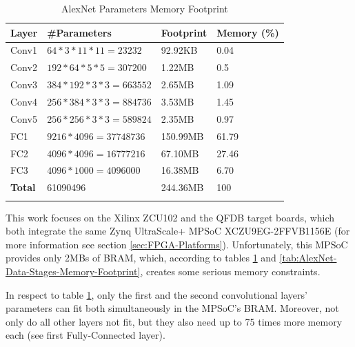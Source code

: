 \begin{table}[H]
	\caption{AlexNet Parameters Memory Footprint}
	\label{tab:AlexNet-Parameters-Memory-Footprint}
	\centering
	\begin{tabular}{llll}
		\toprule
		\textbf{Layer} & \textbf{\#Parameters} & \textbf{Footprint} & \textbf{Memory (\%)}  \\
		\midrule
			Conv1 & $64 * 3 * 11 * 11 = 23232$ & 92.92KB & 0.04 \\
			Conv2 & $192 * 64 * 5 * 5 = 307200$ & 1.22MB & 0.5 \\
			Conv3 & $384 * 192 * 3 * 3 = 663552$ & 2.65MB & 1.09 \\
			Conv4 & $256 * 384 * 3 * 3 = 884736$ & 3.53MB & 1.45 \\
			Conv5 & $256 * 256 * 3 * 3 = 589824$ & 2.35MB & 0.97 \\
			FC1 & $9216 * 4096 = 37748736$ & 150.99MB & 61.79 \\
			FC2 & $4096 * 4096 = 16777216$ & 67.10MB & 27.46 \\
			FC3 & $4096 * 1000 = 4096000$ & 16.38MB & 6.70 \\
		\midrule
			\textbf{Total} & 61090496 & 244.36MB & 100 \\
		\bottomrule\\
	\end{tabular}
\end{table}

This work focuses on the Xilinx ZCU102 \cite{ZCU102-User-Guide} \cite{ZCU102-Product-Overview} and the QFDB \cite{Implementation-and-Impact-of-an-Ultra-Compact-Multi-FPGA-Board-for-Large-System-Prototyping} target boards, which both integrate the same Zynq UltraScale+ MPSoC XCZU9EG-2FFVB1156E (for more information see section \ref{sec:FPGA-Platforms}). Unfortunately, this MPSoC provides only 2MBs of BRAM, which, according to tables \ref{tab:AlexNet-Parameters-Memory-Footprint} and \ref{tab:AlexNet-Data-Stages-Memory-Footprint}, creates some serious memory constraints.

In respect to table \ref{tab:AlexNet-Parameters-Memory-Footprint}, only the first and the second convolutional layers' parameters can fit both simultaneously in the MPSoC's BRAM. Moreover, not only do all other layers not fit, but they also need up to 75 times more memory each (see first Fully-Connected layer).

